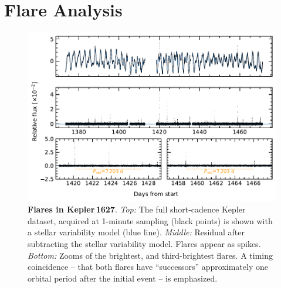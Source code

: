 \documentclass[12pt,modern,twocolumn,tighten]{aastex63}
\begin{document}
\section{Flare Analysis}
\label{app:flare}

\begin{figure}[t]
	\begin{center}
		\leavevmode
		\includegraphics[width=1\textwidth]{f7.pdf}
	\end{center}
	\vspace{-0.7cm}
	\caption{
		{\bf Flares in Kepler\,1627}.  
    {\it Top:}
    The full short-cadence Kepler dataset, acquired at 1-minute
    sampling (black points) is shown with a stellar variability model
    (blue line).
    {\it Middle:}
    Residual after subtracting the stellar variability model.  Flares
    appear as spikes.
    {\it Bottom:}
    Zooms of the brightest, and third-brightest flares.  A timing
    coincidence -- that both flares have ``successors'' approximately
    one orbital period after the initial event -- is emphasized.
		\label{fig:flarezoom}
	}
\end{figure}
\end{document}
